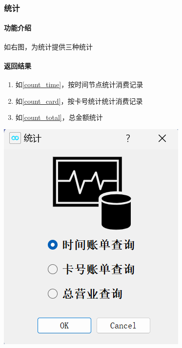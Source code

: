 \documentclass{article}
\begin{document}
    \subsubsection{统计}
    \begin{minipage}[h]{0.5\linewidth}
        \paragraph{功能介绍}
        如右图，为统计提供三种统计
        \vfill
        \paragraph{返回结果}
        \begin{enumerate}
            \item 如\ref{count_time}，按时间节点统计消费记录
            \item 如\ref{count_card}，按卡号统计统计消费记录
            \item 如\ref{count_total}，总金额统计
        \end{enumerate}
    \end{minipage}
    \begin{minipage}[h]{0.45\linewidth}
        \centering
        \includegraphics[scale=0.5]{figure/count.png}
        \label{count}
    \end{minipage}
\end{document}

